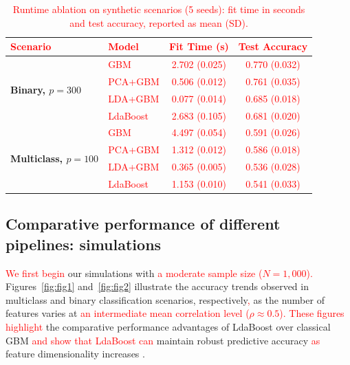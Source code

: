 \documentclass[11pt,a4paper]{article}
\providecommand{\DIFaddtex}[1]{\textcolor{red}{#1}}
\providecommand{\DIFaddbegin}{}
\providecommand{\DIFaddend}{}
\providecommand{\DIFadd}[1]{\texorpdfstring{\DIFaddtex{#1}}{#1}}
\providecommand{\DIFaddFL}[1]{\DIFadd{#1}}
\begin{document}
\begin{table}[h!]
\centering
\begingroup
\setlength{\tabcolsep}{4.5pt}
\renewcommand{\arraystretch}{1.0}
\footnotesize
\caption{\DIFaddFL{Runtime ablation on synthetic scenarios (5 seeds): fit time in seconds and test accuracy, reported as mean (SD).}}
\label{tab:runtime_ablation}
\begin{tabular}{@{}llcc@{}}
\toprule
\DIFaddFL{\textbf{Scenario} }& \DIFaddFL{\textbf{Model} }& \DIFaddFL{\textbf{Fit Time (s)} }& \DIFaddFL{\textbf{Test Accuracy} }\\
\midrule
\multirow{4}{*}{\textbf{Binary, $p=300$}}
    & \DIFaddFL{GBM      }& \DIFaddFL{2.702 (0.025) }& \DIFaddFL{0.770 (0.032) }\\
    & \DIFaddFL{PCA+GBM  }& \DIFaddFL{0.506 (0.012) }& \DIFaddFL{0.761 (0.035) }\\
    & \DIFaddFL{LDA+GBM  }& \DIFaddFL{0.077 (0.014) }& \DIFaddFL{0.685 (0.018) }\\
    & \DIFaddFL{LdaBoost }& \DIFaddFL{2.683 (0.105) }& \DIFaddFL{0.681 (0.020) }\\
\midrule
\multirow{4}{*}{\textbf{Multiclass, $p=100$}}
    & \DIFaddFL{GBM      }& \DIFaddFL{4.497 (0.054) }& \DIFaddFL{0.591 (0.026) }\\
    & \DIFaddFL{PCA+GBM  }& \DIFaddFL{1.312 (0.012) }& \DIFaddFL{0.586 (0.018) }\\
    & \DIFaddFL{LDA+GBM  }& \DIFaddFL{0.365 (0.005) }& \DIFaddFL{0.536 (0.028) }\\
    & \DIFaddFL{LdaBoost }& \DIFaddFL{1.153 (0.010) }& \DIFaddFL{0.541 (0.033) }\\
\bottomrule
\end{tabular}
\endgroup
\end{table}

\DIFaddend 
\subsection*{Comparative performance of different pipelines: simulations}
 \DIFaddbegin \DIFadd{We first begin }\DIFaddend our simulations with  \DIFaddbegin \DIFadd{a moderate sample size ($N=1{,}000$). }\DIFaddend Figures~\ref{fig:fig1} and~\ref{fig:fig2} illustrate the accuracy trends observed in  multiclass and binary classification scenarios, respectively\DIFaddbegin \DIFadd{, }\DIFaddend as the number of features varies at  \DIFaddbegin \DIFadd{an intermediate mean correlation level ($\rho\approx 0.5$). These figures highlight }\DIFaddend the comparative performance advantages of LdaBoost over classical GBM  \DIFaddbegin \DIFadd{and show that LdaBoost can }\DIFaddend maintain robust predictive accuracy  \DIFaddbegin \DIFadd{as }\DIFaddend feature dimensionality increases .
\end{document}
